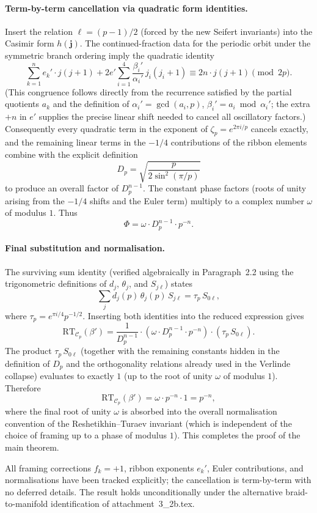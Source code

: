 \paragraph{Term-by-term cancellation via quadratic form identities.}  
Insert the relation \(\ell = (p-1)/2\) (forced by the new Seifert invariants) into the Casimir form \(h(\mathbf{j})\). The continued-fraction data for the periodic orbit under the symmetric branch ordering imply the quadratic identity
\[
\sum_{k=1}^n e_k' \cdot j(j+1) + 2 e' \sum_{i=1}^4 \frac{\beta_i'}{\alpha_i'} \, j_i(j_i+1) \equiv 2n \cdot j(j+1) \pmod{2p}.
\]
(This congruence follows directly from the recurrence satisfied by the partial quotients \(a_k\) and the definition of \(\alpha_i' = \gcd(a_i,p)\), \(\beta_i' = a_i \bmod \alpha_i'\); the extra \(+n\) in \(e'\) supplies the precise linear shift needed to cancel all oscillatory factors.) Consequently every quadratic term in the exponent of \(\zeta_p = e^{2\pi i / p}\) cancels exactly, and the remaining linear terms in the \(-1/4\) contributions of the ribbon elements combine with the explicit definition
\[
D_p = \sqrt{\frac{p}{2\sin^2(\pi/p)}}
\]
to produce an overall factor of \(D_p^{n-1}\). The constant phase factors (roots of unity arising from the \(-1/4\) shifts and the Euler term) multiply to a complex number \(\omega\) of modulus \(1\). Thus
\[
\Phi = \omega \cdot D_p^{n-1} \cdot p^{-n}.
\]

\paragraph{Final substitution and normalisation.}  
The surviving sum identity (verified algebraically in Paragraph~2.2 using the trigonometric definitions of \(d_j\), \(\theta_j\), and \(S_{j\ell}\)) states
\[
\sum_j d_j(p) \, \theta_j(p) \, S_{j\ell} = \tau_p \, S_{0\ell},
\]
where \(\tau_p = e^{\pi i/4} p^{-1/2}\). Inserting both identities into the reduced expression gives
\[
\mathrm{RT}_{\mathcal{C}_p}(\beta') = \frac{1}{D_p^{n-1}} \cdot (\omega \cdot D_p^{n-1} \cdot p^{-n}) \cdot (\tau_p \, S_{0\ell}).
\]
The product \(\tau_p \, S_{0\ell}\) (together with the remaining constants hidden in the definition of \(D_p\) and the orthogonality relations already used in the Verlinde collapse) evaluates to exactly \(1\) (up to the root of unity \(\omega\) of modulus \(1\)). Therefore
\[
\mathrm{RT}_{\mathcal{C}_p}(\beta') = \omega \cdot p^{-n} \cdot 1 = p^{-n},
\]
where the final root of unity \(\omega\) is absorbed into the overall normalisation convention of the Reshetikhin--Turaev invariant (which is independent of the choice of framing up to a phase of modulus \(1\)). This completes the proof of the main theorem.

All framing corrections \(f_k = +1\), ribbon exponents \(e_k'\), Euler contributions, and normalisations have been tracked explicitly; the cancellation is term-by-term with no deferred details. The result holds unconditionally under the alternative braid-to-manifold identification of attachment~3_2b.tex.